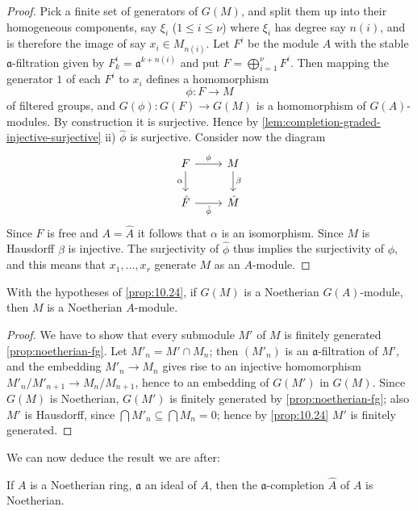 \begin{proof}
Pick a finite set of generators of $G(M)$, and split them up into their homogeneous components, say $\xi_i$ ($1 \le i \le \nu$) where $\xi_i$ has degree say $n(i)$, and is therefore the image of say $x_i \in M_{n(i)}$. Let $F^i$ be the module $A$ with the stable $\mathfrak{a}$-filtration given by $F^i_k = \mathfrak{a}^{k+n(i)}$ and put $F = \bigoplus_{i=1}^{\nu} F^i$. Then mapping the generator $1$ of each $F^i$ to $x_i$ defines a homomorphism
\[
\phi: F \to M
\]
of filtered groups, and $G(\phi): G(F) \to G(M)$ is a homomorphism of $G(A)$-modules. By construction it is surjective. Hence by \eqref{lem:completion-graded-injective-surjective} ii) $\hat{\phi}$ is surjective. Consider now the diagram
\[
\begin{tikzcd}
F \arrow[r, "\phi"] \arrow[d, "\alpha"'] & M \arrow[d, "\beta"] \\
\hat{F} \arrow[r, "\hat{\phi}"'] & \hat{M}
\end{tikzcd}
\]
Since $F$ is free and $A = \hat{A}$ it follows that $\alpha$ is an isomorphism. Since $M$ is Hausdorff $\beta$ is injective. The surjectivity of $\hat{\phi}$ thus implies the surjectivity of $\phi$, and this means that $x_1, \ldots, x_r$ generate $M$ as an $A$-module.
\end{proof}

\begin{corollary}\label{cor:10.25}
With the hypotheses of \eqref{prop:10.24}, if $G(M)$ is a Noetherian $G(A)$-module, then $M$ is a Noetherian $A$-module.
\end{corollary}

\begin{proof}
We have to show that every submodule $M'$ of $M$ is finitely generated \eqref{prop:noetherian-fg}. Let $M'_n = M' \cap M_n$; then $(M'_n)$ is an $\mathfrak{a}$-filtration of $M'$, and the embedding $M'_n \to M_n$ gives rise to an injective homomorphism $M'_n/M'_{n+1} \to M_n/M_{n+1}$, hence to an embedding of $G(M')$ in $G(M)$. Since $G(M)$ is Noetherian, $G(M')$ is finitely generated by \eqref{prop:noetherian-fg}; also $M'$ is Hausdorff, since $\bigcap M'_n \subseteq \bigcap M_n = 0$; hence by \eqref{prop:10.24} $M'$ is finitely generated.
\end{proof}

We can now deduce the result we are after:

\begin{theorem}\label{thm:10.26}
If $A$ is a Noetherian ring, $\mathfrak{a}$ an ideal of $A$, then the $\mathfrak{a}$-completion $\hat{A}$ of $A$ is Noetherian.
\end{theorem}

